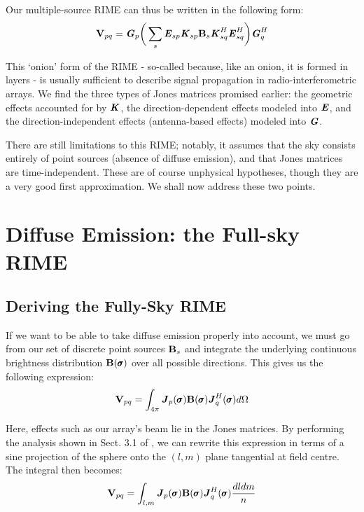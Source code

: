 \pg
Our multiple-source RIME can thus be written in the following form:
\begin{equation}\label{eq.multiple.source.RIME}
\textbf{V}_{pq} = \textbf{\emph{G}}_p \bigg( \sum_s \textbf{\emph{E}}_{sp} \textbf{\emph{K}}_{sp} \textbf{B}_{s} \textbf{\emph{K}}_{sq}^H \textbf{\emph{E}}_{sq}^H \bigg) \textbf{\emph{G}}_q^H
\end{equation}

\pg
This `onion' form of the RIME - so-called because, like an onion, it is formed in layers - is usually sufficient to describe signal propagation in radio-interferometric arrays. We find the three types of Jones matrices promised earlier: the geometric effects accounted for by $\textbf{\emph{K}}$, the direction-dependent effects modeled into $\textbf{\emph{E}}$, and the direction-independent effects (antenna-based effects) modeled into $\textbf{\emph{G}}$.

\pg
There are still limitations to this RIME; notably, it assumes that the sky consists entirely of point sources (absence of diffuse emission), and that Jones matrices are time-independent. These are of course unphysical hypotheses, though they are a very good first approximation. We shall now address these two points.

\section{Diffuse Emission: the Full-sky RIME}
\label{section.RIME.FullSky}

\subsection{Deriving the Fully-Sky RIME}
\label{section.RIME.FullSky.derivation}
\pg
If we want to be able to take diffuse emission properly into account, we must go from our set of discrete point sources $\textbf{B}_s$ and integrate the underlying continuous brightness distribution $\textbf{B}(\pmb{\sigma})$ over all possible directions. This gives us the following expression:
\begin{equation}
\textbf{V}_{pq} = \int_{4\pi} \textbf{\emph{J}}_p(\pmb{\sigma}) \textbf{B}(\pmb{\sigma}) \textbf{\emph{J}}_q^H(\pmb{\sigma})d\Omega
\end{equation}

\pg
Here, effects such as our array's beam lie in the Jones matrices. By performing the analysis shown in Sect. 3.1 of , we can rewrite this expression in terms of a sine projection of the sphere onto the $(l,m)$ plane tangential at field centre. The integral then becomes:
\begin{equation}
\textbf{V}_{pq} = \int_{l,m} \textbf{\emph{J}}_p(\pmb{\sigma}) \textbf{B}(\pmb{\sigma}) \textbf{\emph{J}}_q^H(\pmb{\sigma})\frac{dl dm}{n}
\end{equation}

